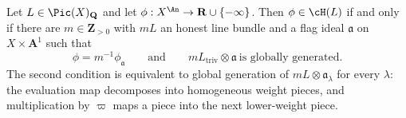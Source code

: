 \begin{proposition}
\label{prop:ch34-fs-flag-ideal}
Let $L\in\Pic(X)_{\mathbf Q}$ and let
$\phi:X^{\An}\to\mathbf R\cup\{-\infty\}$.  Then $\phi\in\cH(L)$ if and
only if there are $m\in\mathbf Z_{>0}$ with $mL$ an honest line bundle
and a flag ideal $\mathfrak a$ on $X\times\mathbf A^1$ such that
\begin{equation}
\label{eq:ch34-fs-flag-ideal}
 \phi=m^{-1}\phi_{\mathfrak a}
 \qquad\text{and}\qquad
 mL_{\mathrm{triv}}\otimes\mathfrak a\ \text{is globally generated}.
\end{equation}
The second condition is equivalent to global generation of
$mL\otimes\mathfrak a_\lambda$ for every $\lambda$: the evaluation
map decomposes into homogeneous weight pieces, and multiplication
by $\varpi$ maps a piece into the next lower-weight piece.
\end{proposition}

